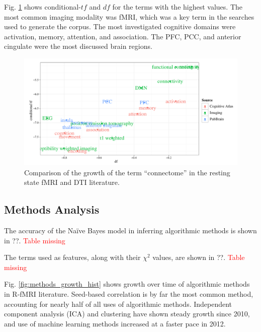 \documentclass[5p]{elsarticle}
\begin{document}
Fig. \ref{fig:tfidf_top2} shows conditional-$t\!f$ and $d\!f$ for the terms with
the highest values. The most common imaging modality was fMRI, which was a key
term in the searches used to generate the corpus. The most investigated
cognitive domains were activation, memory, attention, and association. The PFC,
PCC, and anterior cingulate were the most discussed brain regions. 

\begin{figure}
  \begin{center}
    \includegraphics[width=\linewidth]{figures/tfidf_top2}%
    \caption{Comparison of the growth of the term ``connectome'' in the resting
    state fMRI and DTI literature.
        \label{fig:tfidf_top2}
    }
  \end{center}
\end{figure}

\subsection{Methods Analysis}

The accuracy of the Na\"ive Bayes model in inferring
algorithmic methods is shown in ??. \textcolor{red}{Table missing}

The terms used as features, along with their $\chi^2$ values, are shown in
??. \textcolor{red}{Table missing}

Fig. \ref{fig:methods_growth_hist} shows growth over time of algorithmic methods
in R-fMRI literature.  Seed-based correlation is by far the most common method,
accounting for nearly half of all uses of algorithmic methods. Independent
component analysis (ICA) and clustering have shown steady growth since 2010, and
use of machine learning methods increased at a faster pace in 2012.
\end{document}
